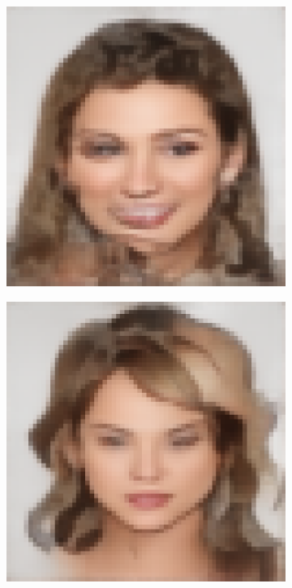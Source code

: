 \documentclass{IEEEcsmag}
\begin{document}
\begin{figure}[ht]
\begin{subfigure}{0.12\textwidth}
    \end{subfigure}
    \begin{subfigure}{0.12\textwidth}
        \includegraphics[width=\linewidth]{Random sketch/generated_images/image2.jpeg_AE_UNET.png}
    \end{subfigure}
    \begin{subfigure}{0.12\textwidth}
        \includegraphics[width=\linewidth]{Digital sketches/generated_images/image7.jpeg_AE_UNET.png}
    \end{subfigure}


\end{figure}
\end{document}
